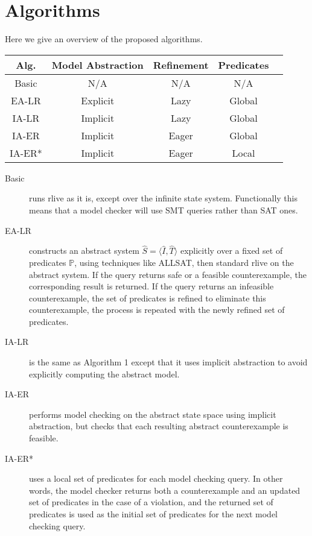 \documentclass{article}
\newcommand{\rlive}{\textsf{rlive}\xspace}
\newcommand{\abs}[1]{\ensuremath{\widehat{#1}}}
\newcommand{\preds}{\ensuremath{\mathbb{P}}}
\begin{document}
\section{Algorithms}

Here we give an overview of the proposed algorithms.

\begin{table}[h]
\centering
\begin{tabular}{|c|c|c|c|c|}
\hline
\textbf{Alg.} & \textbf{Model Abstraction} & \textbf{Refinement} & \textbf{Predicates} \\ 
\hline \hline
Basic         & N/A                        & N/A                 & N/A                 \\ \hline
EA-LR         & Explicit                   & Lazy                & Global              \\ \hline
IA-LR         & Implicit                   & Lazy                & Global              \\ \hline
IA-ER         & Implicit                   & Eager               & Global              \\ \hline
IA-ER*        & Implicit                   & Eager               & Local               \\ \hline
\end{tabular}
\end{table}

\begin{description}
    \item[Basic] runs \rlive as it is, except over the infinite state system. Functionally
    this means that a model checker will use SMT queries rather than SAT ones.

    \item[EA-LR] constructs an abstract system $\abs{S} = \langle \abs{I}, \abs{T} \rangle$
    explicitly over a fixed set of predicates $\preds$, using techniques like ALLSAT, then standard
    \rlive on the abstract system. If the query returns safe or a feasible counterexample, the
    corresponding result is returned. If the query returns an infeasible counterexample, the set of
    predicates is refined to eliminate this counterexample, the process is repeated with the newly
    refined set of predicates.

    \item[IA-LR] is the same as Algorithm 1 except that it uses implicit abstraction to
    avoid explicitly computing the abstract model.
    
    \item[IA-ER] performs model checking on the abstract state space using implicit
    abstraction, but checks that each resulting abstract counterexample is feasible. 
    
    \item[IA-ER*] uses a local set of predicates for each model checking query. In other words,
    the model checker returns both a counterexample and an updated set of predicates in the case of
    a violation, and the returned set of predicates is used as the initial set of predicates for the
    next model checking query. 
\end{description}
\end{document}
